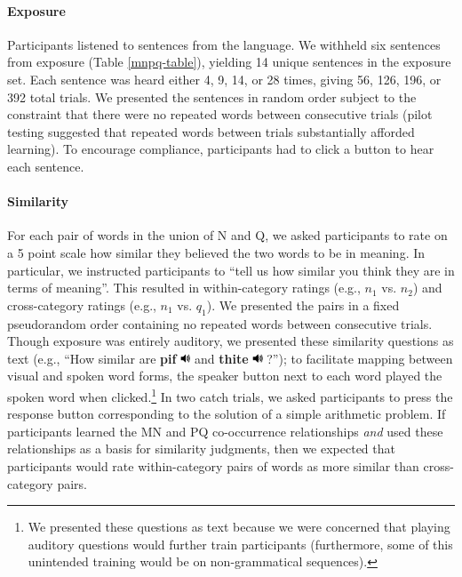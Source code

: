\documentclass[man,longtable,floatsintext]{my-apa6}
\begin{document}
\paragraph{Exposure}
Participants listened to sentences from the language. We withheld six sentences from exposure (Table \ref{mnpq-table}), yielding 14 unique sentences in the exposure set. Each sentence was heard either 4, 9, 14, or 28 times, giving 56, 126, 196, or 392 total trials. We presented the sentences in random order subject to the constraint that there were no repeated words between consecutive trials (pilot testing suggested that repeated words between trials substantially afforded learning). To encourage compliance, participants had to click a button to hear each sentence.

\paragraph{Similarity}
For each pair of words in the union of N and Q, we asked participants to rate on a 5 point scale how similar they believed the two words to be in meaning. In particular, we instructed participants to  ``tell us how similar you think they are in terms of meaning''. This resulted in within-category ratings (e.g., $n_1$ vs. $n_2$) and cross-category ratings (e.g., $n_1$ vs. $q_1$). We presented the pairs in a fixed pseudorandom order containing no repeated words between consecutive trials. Though exposure was entirely auditory, we presented these similarity questions as text (e.g., ``How similar are \textbf{pif} \includegraphics[width=0.3cm]{play.png} and \textbf{thite} \includegraphics[width=0.3cm]{play.png} ?''); to facilitate mapping between visual and spoken word forms, the speaker button next to each word played the spoken word when clicked.\footnote{ We presented these questions as text because we were concerned that playing auditory questions would further train participants (furthermore, some of this unintended training would be on non-grammatical sequences).} In two catch trials, we asked participants to press the response button corresponding to the solution of a simple arithmetic problem. If participants learned the MN and PQ co-occurrence relationships \emph{and} used these relationships as a basis for similarity judgments, then we expected that participants would rate within-category pairs of words as more similar than cross-category pairs.
\end{document}
